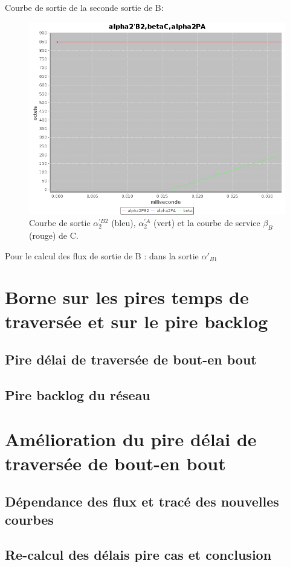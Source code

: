 Courbe de sortie de la seconde sortie de B: 
\begin{figure}[!ht]%
\centering%
\noindent\includegraphics[width = .4\textwidth]{./II/images/alpha2PB2.png}%
\caption{\label{fig:alpha2PB2}Courbe de sortie $\alpha_2^{'B2}$ (bleu), $\alpha_2^{'A}$ (vert) et la courbe de service $\beta_B$ (rouge) de C.}%
\end{figure} 
Pour le calcul des flux de sortie de B : dans la sortie $\alpha'_{B1}$


\section{Borne sur les pires temps de traversée et sur le pire backlog}

\subsection{Pire délai de traversée de bout-en bout}

\subsection{Pire backlog du réseau}

\section{Amélioration du pire délai de traversée de bout-en bout}
\subsection{Dépendance des flux et tracé des nouvelles courbes}
\subsection{Re-calcul des délais pire cas et conclusion}